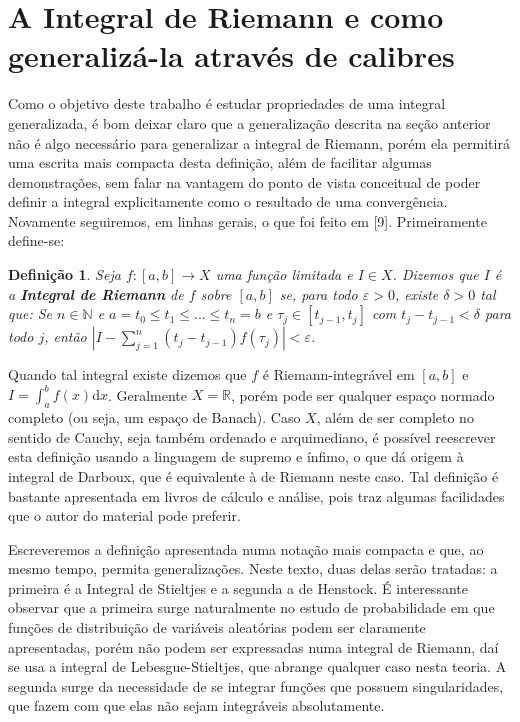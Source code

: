 \documentclass[12pt, a4paper]{article}
\newtheorem{mydef}{Definição}[section]
\theoremstyle{definition}
\begin{document}
\section{A Integral de Riemann e como generalizá-la através de calibres}

Como o objetivo deste trabalho é estudar propriedades de uma integral generalizada, é bom deixar claro que a generalização descrita na seção anterior não é algo necessário para generalizar a integral de Riemann, porém ela permitirá uma escrita mais compacta desta definição, além de facilitar algumas demonstrações, sem falar na vantagem do ponto de vista conceitual de poder definir a integral explicitamente como o resultado de uma convergência. Novamente seguiremos, em linhas gerais, o que foi feito em [9]. Primeiramente define-se:

\begin{mydef}
	
Seja $f:[a,b]\rightarrow X$ uma função limitada e $I\in X$. Dizemos que $I$ é a \textbf{Integral de Riemann} de $f$ sobre $[a,b]$ se, para todo $\varepsilon >0$, existe $\delta >0$ tal que: Se $n\in \mathbb{N}$ e $a=t_0\leq t_1\leq ... \leq t_n=b$ e $\tau_j\in [t_{j-1},t_j ]$ com $t_j-t_{j-1}<\delta$ para todo $j$, então $\left| I-\sum_{j=1}^n (t_j-t_{j-1})f(\tau_j)\right|< \varepsilon$. 
	
\end{mydef}

Quando tal integral existe dizemos que $f$ é Riemann-integrável em $[a,b]$ e $I=\int_a^b f(x) \text{d} x$. Geralmente $X=\mathbb{R}$, porém pode ser qualquer espaço normado completo (ou seja, um espaço de Banach). Caso $X$, além de ser completo no sentido de Cauchy, seja também ordenado e arquimediano, é possível reescrever esta definição usando a linguagem de supremo e ínfimo, o que dá origem à integral de Darboux, que é equivalente à de Riemann neste caso. Tal definição é bastante apresentada em livros de cálculo e análise, pois traz algumas facilidades que o autor do material pode preferir.

Escreveremos a definição apresentada numa notação mais compacta e que, ao mesmo tempo, permita generalizações. Neste texto, duas delas serão tratadas: a primeira é a Integral de Stieltjes e a segunda a de Henstock. É interessante observar que a primeira surge naturalmente no estudo de probabilidade em que funções de distribuição de variáveis aleatórias podem ser claramente apresentadas, porém não podem ser expressadas numa integral de Riemann, daí se usa a integral de Lebesgue-Stieltjes, que abrange qualquer caso nesta teoria. A segunda surge da necessidade de se integrar funções que possuem singularidades, que fazem com que elas não sejam integráveis absolutamente. 
 
\end{document}
